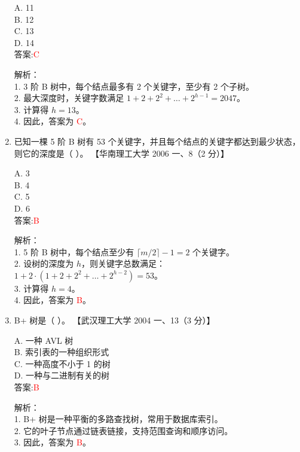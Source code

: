 \documentclass[lang=cn,newtx,10pt,scheme=chinese]{../../../elegantbook}
\begin{document}
\begin{enumerate}
    A. 11 \\  
    B. 12 \\  
    C. 13 \\  
    D. 14 \\  

    答案:\textcolor{red}{C}

    解析：\\
    1. 3 阶 B 树中，每个结点最多有 2 个关键字，至少有 2 个子树。\\
    2. 最大深度时，关键字数满足 $1 + 2 + 2^2 + \dots + 2^{h-1} = 2047$。\\
    3. 计算得 $h = 13$。\\
    4. 因此，答案为 \textcolor{red}{C}。\\

    \item 已知一棵 5 阶 B 树有 53 个关键字，并且每个结点的关键字都达到最少状态，则它的深度是（ ）。  
    【华南理工大学 2006 一、8（2 分）】  

    A. 3 \\  
    B. 4 \\  
    C. 5 \\  
    D. 6 \\  

    答案:\textcolor{red}{B}

    解析：\\
    1. 5 阶 B 树中，每个结点至少有 $\lceil m/2 \rceil - 1 = 2$ 个关键字。\\
    2. 设树的深度为 $h$，则关键字总数满足：$1 + 2 \cdot (1 + 2 + 2^2 + \dots + 2^{h-2}) = 53$。\\
    3. 计算得 $h = 4$。\\
    4. 因此，答案为 \textcolor{red}{B}。\\

\item B+ 树是（ ）。  
    【武汉理工大学 2004 一、13（3 分）】  

    A. 一种 AVL 树 \\  
    B. 索引表的一种组织形式 \\  
    C. 一种高度不小于 1 的树 \\  
    D. 一种与二进制有关的树 \\  

    答案:\textcolor{red}{B}

    解析：\\
    1. B+ 树是一种平衡的多路查找树，常用于数据库索引。\\
    2. 它的叶子节点通过链表链接，支持范围查询和顺序访问。\\
    3. 因此，答案为 \textcolor{red}{B}。\\


\end{enumerate}
\end{document}
